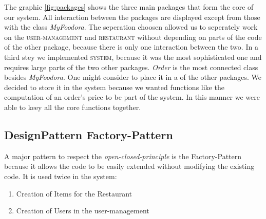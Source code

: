 The graphic \ref{fig:packages} shows the three main packages that form the core of our system. All
interaction between the packages are displayed except from those with the class \textit{MyFoodora}.
The seperation choosen allowed us to seperately work on the \textsc{user-management} and
\textsc{restaurant} without depending on parts of the code of the other package, because there is 
only one interaction between the two. In a third stey we implemented \textsc{system}, because it was
the most sophisticated one and requires large parts of the two other packages. \textit{Order} is the most connected class besides \textit{MyFoodora}. One might consider to place it in a of the other 
packages. We decided to store it in the system because we wanted functions like the computation of 
an order's price to be part of the system. In this manner we were able to keey all the core functions
together. 

\subsection{DesignPattern Factory-Pattern}
\label{sub:designpattern_factory_pattern}

A major pattern to respect the \textit{open-closed-principle} is the Factory-Pattern because it
allows the code to be easily extended without modifying the existing code. It is used twice in the
system:
\begin{enumerate}
	\item Creation of Items for the Restaurant
	\item Creation of Users in the user-management
\end{enumerate}
